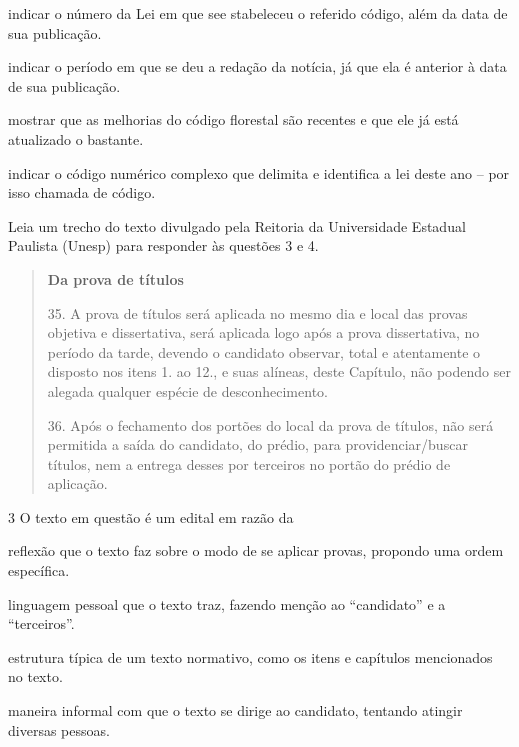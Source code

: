 \begin{escolha}
\item indicar o número da Lei em que see stabeleceu o referido código,
além da data de sua publicação.

\item indicar o período em que se deu a redação da notícia, já que ela é
anterior à data de sua publicação.

\item mostrar que as melhorias do código florestal são recentes e que ele
já está atualizado o bastante.

\item indicar o código numérico complexo que delimita e identifica a lei
deste ano -- por isso chamada de código.
\end{escolha}


Leia um trecho do texto divulgado pela Reitoria da Universidade Estadual
Paulista (Unesp) para responder às questões 3 e 4.

\begin{quote}
\textbf{Da prova de títulos}


35. A prova de títulos será aplicada no mesmo dia e local das provas
objetiva e dissertativa, será aplicada logo após a prova dissertativa,
no período da tarde, devendo o candidato observar, total e atentamente o
disposto nos itens 1. ao 12., e suas alíneas, deste Capítulo, não
podendo ser alegada qualquer espécie de desconhecimento.

36. Após o fechamento dos portões do local da prova de títulos, não será
permitida a saída do candidato, do prédio, para providenciar/buscar
títulos, nem a entrega desses por terceiros no portão do prédio de
aplicação.

\end{quote}

\num{3} O texto em questão é um edital em razão da

\begin{escolha}
\item reflexão que o texto faz sobre o modo de se aplicar provas, propondo
uma ordem específica.

\item linguagem pessoal que o texto traz, fazendo menção ao ``candidato''
e a ``terceiros''.

\item estrutura típica de um texto normativo, como os itens e capítulos
mencionados no texto.

\item maneira informal com que o texto se dirige ao candidato, tentando
atingir diversas pessoas.
\end{escolha}

